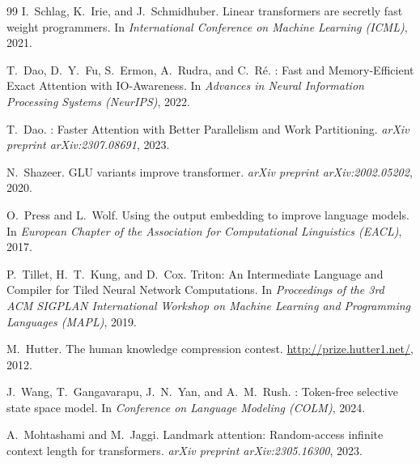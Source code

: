 \documentclass{article}
\begin{document}
\begin{thebibliography}{99}
I.\ Schlag, K.\ Irie, and J.\ Schmidhuber.
\newblock Linear transformers are secretly fast weight programmers.
\newblock In \emph{International Conference on Machine Learning (ICML)}, 2021.

T.\ Dao, D.\ Y.\ Fu, S.\ Ermon, A.\ Rudra, and C.\ R\'e.
: Fast and Memory-Efficient Exact Attention with {IO}-Awareness.
\newblock In \emph{Advances in Neural Information Processing Systems (NeurIPS)},
2022.

T.\ Dao.
: Faster Attention with Better Parallelism and Work Partitioning.
\newblock \emph{arXiv preprint arXiv:2307.08691}, 2023.

N.\ Shazeer.
\newblock GLU variants improve transformer.
\newblock \emph{arXiv preprint arXiv:2002.05202}, 2020.

O.\ Press and L.\ Wolf.
\newblock Using the output embedding to improve language models.
\newblock In \emph{European Chapter of the Association for Computational
Linguistics (EACL)}, 2017.

P.\ Tillet, H.\ T.\ Kung, and D.\ Cox.
\newblock Triton: An Intermediate Language and Compiler for Tiled Neural Network Computations.
\newblock In \emph{Proceedings of the 3rd ACM SIGPLAN International Workshop on Machine Learning and Programming Languages (MAPL)}, 2019.

M.\ Hutter.
\newblock The human knowledge compression contest.
\newblock \url{http://prize.hutter1.net/}, 2012.

J.\ Wang, T.\ Gangavarapu, J.\ N.\ Yan, and A.\ M.\ Rush.
: Token-free selective state space model.
\newblock In \emph{Conference on Language Modeling (COLM)}, 2024.

A.\ Mohtashami and M.\ Jaggi.
\newblock Landmark attention: Random-access infinite context length for
transformers.
\newblock \emph{arXiv preprint arXiv:2305.16300}, 2023.

\end{thebibliography}
\end{document}
